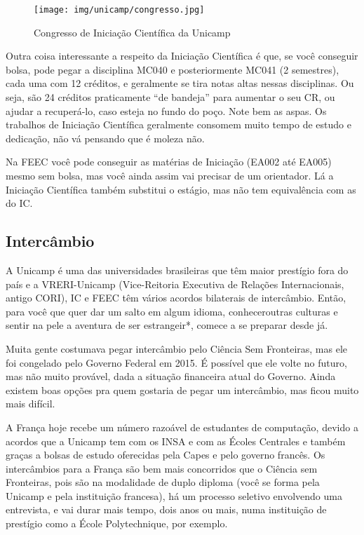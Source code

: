 \begin{figure}[h!]
    \centering
    \texttt{[image: img/unicamp/congresso.jpg]}
    \caption*{Congresso de Iniciação Científica da Unicamp}
\end{figure}

Outra coisa interessante a respeito da Iniciação Científica é que, se você
conseguir bolsa, pode pegar a disciplina MC040 e posteriormente MC041 (2
semestres), cada uma com 12 créditos, e geralmente se tira notas altas nessas
disciplinas.  Ou seja, são 24 créditos praticamente ``de bandeja'' para aumentar
o seu CR, ou ajudar a recuperá-lo, caso esteja no fundo do poço. Note bem as
aspas.  Os trabalhos de Iniciação Científica geralmente consomem muito tempo de
estudo e dedicação, não vá pensando que é moleza não.

Na FEEC você pode conseguir as matérias de Iniciação (EA002 até EA005) mesmo sem
bolsa, mas você ainda assim vai precisar de um orientador. Lá a Iniciação
Científica também substitui o estágio, mas não tem equivalência com as do IC.

\subsection{Intercâmbio}

A Unicamp é uma das universidades brasileiras que têm maior prestígio fora do
país e a VRERI-Unicamp (Vice-Reitoria Executiva de Relações Internacionais,
antigo CORI), IC e FEEC têm vários acordos bilaterais de intercâmbio. Então,
para você que quer dar um salto em algum idioma, conheceroutras culturas e
sentir na pele a aventura de ser estrangeir*, comece a se preparar desde já.

Muita gente costumava pegar intercâmbio pelo Ciência Sem Fronteiras, mas ele foi
congelado pelo Governo Federal em 2015. É possível que ele volte no futuro, mas
não muito provável, dada a situação financeira atual do Governo. Ainda existem
boas opções pra quem gostaria de pegar um intercâmbio, mas ficou muito mais
difícil.

A França hoje recebe um número razoável de estudantes de computação, devido a
acordos que a Unicamp tem com os INSA e com as Écoles Centrales e também graças
a bolsas de estudo oferecidas pela Capes e pelo governo francês. Os intercâmbios
para a França são bem mais concorridos que o Ciência sem Fronteiras, pois são na
modalidade de duplo diploma (você se forma pela Unicamp e pela instituição
francesa), há um processo seletivo envolvendo uma entrevista, e vai durar mais
tempo, dois anos ou mais, numa instituição de prestígio como a École
Polytechnique, por exemplo.

